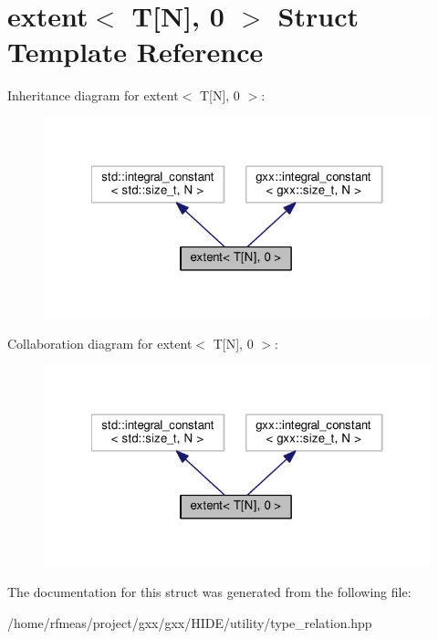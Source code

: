 \hypertarget{structextent_3_01T[N]_00_010_01_4}{}\section{extent$<$ T\mbox{[}N\mbox{]}, 0 $>$ Struct Template Reference}
\label{structextent_3_01T[N]_00_010_01_4}


Inheritance diagram for extent$<$ T\mbox{[}N\mbox{]}, 0 $>$\+:
\nopagebreak
\begin{figure}[H]
\begin{center}
\leavevmode
\includegraphics[width=322pt]{structextent_3_01T[N]_00_010_01_4__inherit__graph}
\end{center}
\end{figure}


Collaboration diagram for extent$<$ T\mbox{[}N\mbox{]}, 0 $>$\+:
\nopagebreak
\begin{figure}[H]
\begin{center}
\leavevmode
\includegraphics[width=322pt]{structextent_3_01T[N]_00_010_01_4__coll__graph}
\end{center}
\end{figure}


The documentation for this struct was generated from the following file\+:\begin{DoxyCompactItemize}
\item 
/home/rfmeas/project/gxx/gxx/\+H\+I\+D\+E/utility/type\+\_\+relation.\+hpp\end{DoxyCompactItemize}
